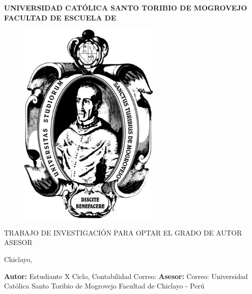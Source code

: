 \pagestyle{empty}
\begin{center}\bf
UNIVERSIDAD CATÓLICA SANTO TORIBIO DE MOGROVEJO\break
FACULTAD DE \MakeUppercase{\Facultad}\break
ESCUELA DE\MakeUppercase{\Escuela}

\begin{figure}[h]
    \centering\includegraphics[height=100mm]{archivos/escudo-usat.png}
\end{figure}

{\large\TituloArticulo}\break\break
TRABAJO DE INVESTIGACIÓN PARA OPTAR EL GRADO DE\break
\MakeUppercase{\GradoArticulo}\break\break
AUTOR\break
{\Autor}\break\break
ASESOR\break
{\Asesor}{\small\break\href{\Orcid}{\textmd{\Orcid}}}\break

Chiclayo,\Fecha
\end{center}
\newpage

\begin{center}
\large\bf\MakeUppercase{\TituloArticulo}
\end{center}

\begin{flushright}
\textbf{Autor:} \Autor
Estudiante X Ciclo, Contabilidad\break
Correo: \AutorEmail\break
\textbf{Asesor:} \Asesor
\Orcid
Correo: \AsesorEmail
Universidad Católica Santo Toribio de Mogrovejo\break
Facultad de \Facultad
\FechaArticulo Chiclayo - Perú
\end{flushright}
